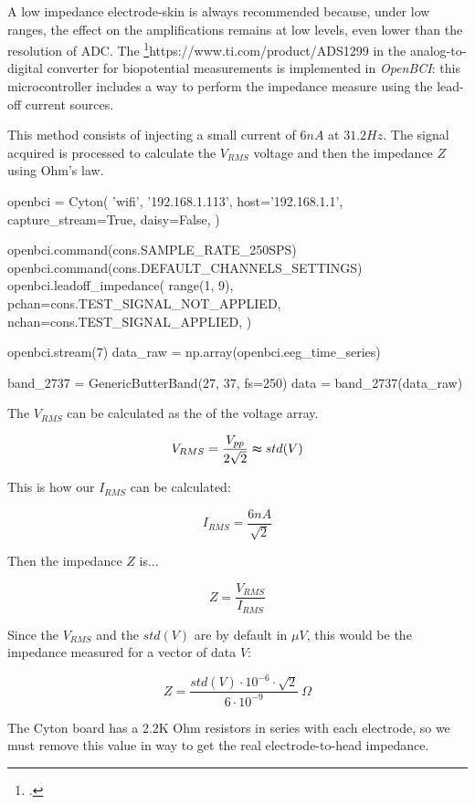 A low impedance electrode-skin is always recommended because, under low ranges, the effect on the amplifications remains at low levels, even lower than the resolution of \Gls*{ADC}. The \footcite{ADS1299}{https://www.ti.com/product/ADS1299} in the analog-to-digital converter for biopotential measurements is implemented in \textit{OpenBCI}: this microcontroller includes a way to perform the impedance measure using the lead-off current sources. 

This method consists of injecting a small current of $6 nA$ at $31.2 Hz$. The signal acquired is processed to calculate the $V_{RMS}$ voltage and then the impedance $Z$ using Ohm’s law. 

\begin{python}
openbci = Cyton(
    'wifi',
    '192.168.1.113',
    host='192.168.1.1',
    capture_stream=True,
    daisy=False,
)

openbci.command(cons.SAMPLE_RATE_250SPS)
openbci.command(cons.DEFAULT_CHANNELS_SETTINGS)
openbci.leadoff_impedance(
    range(1, 9),
    pchan=cons.TEST_SIGNAL_NOT_APPLIED,
    nchan=cons.TEST_SIGNAL_APPLIED,
)

openbci.stream(7)
data_raw = np.array(openbci.eeg_time_series)
\end{python}



\begin{python}
band_2737 = GenericButterBand(27, 37, fs=250)
data = band_2737(data_raw)
\end{python}



The $V_{RMS}$ can be calculated as the  of the voltage array.

\[
V_{RMS}=\frac{V_{pp}}{2\sqrt{2}}\thickapprox std(V) 
\]

This is how our $I_{RMS}$ can be calculated:

\[
I_{RMS}=\frac{6nA}{\sqrt{2}}
\]


Then the impedance $Z$ is...

\[
Z=\frac{V_{RMS}}{I_{RMS}}
\]

Since the $V_{RMS}$ and the $std(V)$ are by default in $\mu V$, this would be the impedance measured for a vector of data $V$:

\[
Z=\frac{std(V)\cdot10^{-6}\cdot\sqrt{2}}{6\cdot10^{-9}}\:\Omega
\]

The Cyton board has a 2.2K Ohm resistors in series with each electrode, so we must remove this value in way to get the real electrode-to-head impedance.


